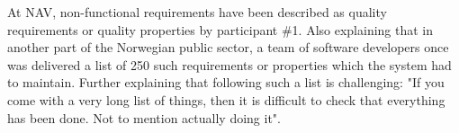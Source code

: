 
At NAV, non-functional requirements have been described as quality requirements or quality properties by participant \#1. Also explaining that in another part of the Norwegian public sector, a team of software developers once was delivered a list of 250 such requirements or properties which the system had to maintain. Further explaining that following such a list is challenging: "If you come with a very long list of things, then it is difficult to check that everything has been done. Not to mention actually doing it". 





